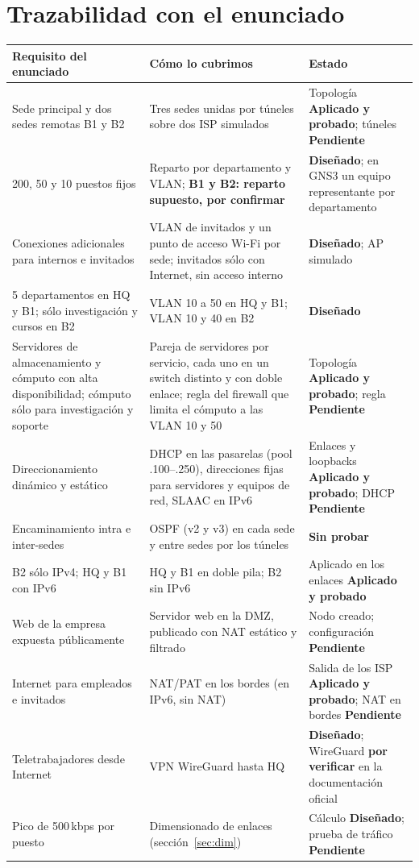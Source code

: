 \documentclass[11pt,a4paper]{article}
\newcommand{\ok}{\textcolor{verde}{\textbf{Aplicado y probado}}}
\newcommand{\dis}{\textcolor{azul}{\textbf{Diseñado}}}
\newcommand{\pen}{\textcolor{rojo}{\textbf{Pendiente}}}
\newcommand{\sinp}{\textcolor{naranja}{\textbf{Sin probar}}}
\begin{document}
\section{Trazabilidad con el enunciado}
\begingroup\footnotesize
\begin{longtable}{@{}p{3.3cm}p{8.4cm}p{4.8cm}@{}}
\toprule
\textbf{Requisito del enunciado} & \textbf{Cómo lo cubrimos} & \textbf{Estado}\\
\midrule
\endhead
Sede principal y dos sedes remotas B1 y B2 & Tres sedes unidas por túneles sobre dos ISP simulados & Topología \ok; túneles \pen\\
200, 50 y 10 puestos fijos & Reparto por departamento y VLAN; \textbf{B1 y B2: reparto supuesto, por confirmar} & \dis; en GNS3 un equipo representante por departamento\\
Conexiones adicionales para internos e invitados & VLAN de invitados y un punto de acceso Wi-Fi por sede; invitados sólo con Internet, sin acceso interno & \dis; AP simulado\\
5 departamentos en HQ y B1; sólo investigación y cursos en B2 & VLAN 10 a 50 en HQ y B1; VLAN 10 y 40 en B2 & \dis\\
Servidores de almacenamiento y cómputo con alta disponibilidad; cómputo sólo para investigación y soporte & Pareja de servidores por servicio, cada uno en un switch distinto y con doble enlace; regla del firewall que limita el cómputo a las VLAN 10 y 50 & Topología \ok; regla \pen\\
Direccionamiento dinámico y estático & DHCP en las pasarelas (pool .100--.250), direcciones fijas para servidores y equipos de red, SLAAC en IPv6 & Enlaces y loopbacks \ok; DHCP \pen\\
Encaminamiento intra e inter-sedes & OSPF (v2 y v3) en cada sede y entre sedes por los túneles & \sinp\\
B2 sólo IPv4; HQ y B1 con IPv6 & HQ y B1 en doble pila; B2 sin IPv6 & Aplicado en los enlaces \ok\\
Web de la empresa expuesta públicamente & Servidor web en la DMZ, publicado con NAT estático y filtrado & Nodo creado; configuración \pen\\
Internet para empleados e invitados & NAT/PAT en los bordes (en IPv6, sin NAT) & Salida de los ISP \ok; NAT en bordes \pen\\
Teletrabajadores desde Internet & VPN WireGuard hasta HQ & \dis; WireGuard \textbf{por verificar} en la documentación oficial\\
Pico de 500\,kbps por puesto & Dimensionado de enlaces (sección~\ref{sec:dim}) & Cálculo \dis; prueba de tráfico \pen\\

\end{longtable}
\end{document}

